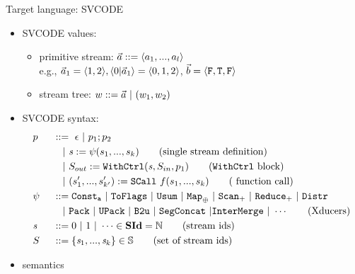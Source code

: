 \documentclass{beamer}
\begin{document}
\begin{frame}{Target language: SVCODE}
	\begin{itemize}
	\item SVCODE values:
		\begin{itemize}
			\item primitive stream: $\a ::= \<a_1,...,a_l\'>$ \\ 
			e.g., $\a_1 = \<1,2\'>,  \<0 | \a_1 \'> = \<0,1,2\'>$, $\b = \<\F, \T , \F\'>$
			\item stream tree: $w ::= \a \ | \ (w_1,w_2)$
		\end{itemize}
\pause		
	\item SVCODE syntax:
		{\footnotesize \begin{alignat*}{2} 
		&p  && :: = \ \epsilon \ | \ p_1;p_2 \\ 
		&   && \quad | \ \sdef{\s}{\psi(s_1,...,s_k)}  \tag{single stream definition}\\
		&   && \quad | \ \withctrl{\s}{p_1}{\Sin}{\Sout}  \tag{\wc block}\\
		&   && \quad | \ \scall{f}{s_1,...,s_k}{(s_1',...,s_{k'}')} \tag{ function call}\\
		& \psi \ && ::= \consta{a} \ | \ \toflag  
		\ | \ \usum \ | \ \map{\oplus} \ | \ \genscan_{+} \ | \ \genreduce_{+} \ | \ \distr    \\
		&   && \quad  | \ \pack \ | \ \upack \ | \ \bu \ | \ \segconcat \ | \intermerge \ | \ \cdots  \tag{Xducers} \\
		&\s && ::= 0 \ | \ 1 \ | \ \cdots \in \SId  = \mathbb{N}   \tag{stream ids}\\
		&  \S && ::= \{\s_1,..., \s_k\} \in \sset  \tag{set of stream ids}\\	
		\end{alignat*}}
		
		\item semantics
	\end{itemize}
\end{frame}
\end{document}
